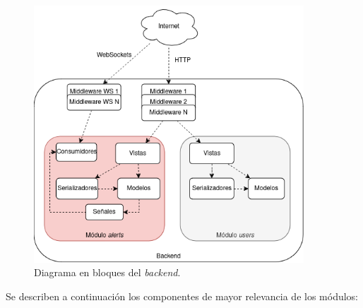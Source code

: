 \begin{figure}[H]
	\centering
	\includegraphics[width=0.9\textwidth]{./Figures/backend-componentes.png}
	\caption{Diagrama en bloques del \textit{backend}.}
	\label{backend:modulos}
\end{figure}

Se describen a continuación los componentes de mayor relevancia de los módulos:

